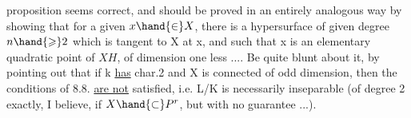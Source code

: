 
proposition seems correct, and should be proved in an entirely analogous way
by showing that for a given $x\hand{\in} X$, there is a hypersurface  of given degree $n\hand{\geqslant} 2$
which is tangent to X at x, and such that x is an elementary quadratic
point of $X$\hand{$\cap$}$H$, of dimension one less .... Be quite blunt about
it, by pointing out that if k \uline{has} char.2 and X is
connected  of odd dimension, then the conditions of 8.8. \uline{are not}
satisfied, i.e. L/K is necessarily inseparable (of degree
2 exactly, I believe, if $X\hand{\subset} P^r$, but with no guarantee ...).

